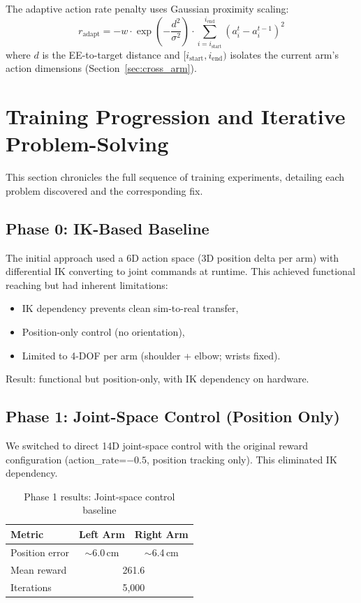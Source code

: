 \documentclass[11pt,a4paper]{article}
\begin{document}
\noindent The adaptive action rate penalty uses Gaussian proximity scaling:
\begin{equation}
  r_{\text{adapt}} = -w \cdot \exp\!\left(-\frac{d^2}{\sigma^2}\right) \cdot \sum_{i=i_{\text{start}}}^{i_{\text{end}}} (a_i^t - a_i^{t-1})^2
\end{equation}
where $d$ is the EE-to-target distance and $[i_{\text{start}}, i_{\text{end}})$ isolates the current arm's action dimensions (Section~\ref{sec:cross_arm}).

\section{Training Progression and Iterative Problem-Solving}
\label{sec:training}

This section chronicles the full sequence of training experiments, detailing each problem discovered and the corresponding fix.

\subsection{Phase 0: IK-Based Baseline}
The initial approach used a 6D action space (3D position delta per arm) with differential IK converting to joint commands at runtime. This achieved functional reaching but had inherent limitations:
\begin{itemize}[nosep]
  \item IK dependency prevents clean sim-to-real transfer,
  \item Position-only control (no orientation),
  \item Limited to 4-DOF per arm (shoulder + elbow; wrists fixed).
\end{itemize}
Result: functional but position-only, with IK dependency on hardware.

\subsection{Phase 1: Joint-Space Control (Position Only)}
\label{sec:phase1}
We switched to direct 14D joint-space control with the original reward configuration (action\_rate=$-0.5$, position tracking only). This eliminated IK dependency.

\begin{table}[H]
\centering
\caption{Phase 1 results: Joint-space control baseline}
\begin{tabular}{@{}lcc@{}}
\toprule
\textbf{Metric} & \textbf{Left Arm} & \textbf{Right Arm} \\
\midrule
Position error & $\sim$6.0\,cm & $\sim$6.4\,cm \\
Mean reward & \multicolumn{2}{c}{261.6} \\
Iterations & \multicolumn{2}{c}{5,000} \\
\bottomrule
\end{tabular}
\end{table}
\end{document}
